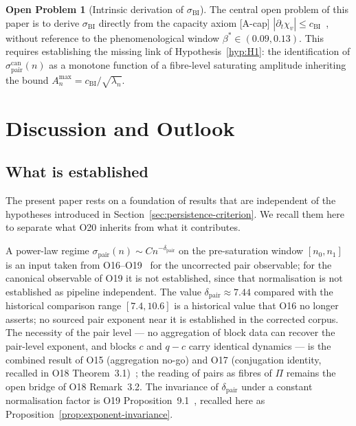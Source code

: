 \documentclass[11pt,a4paper]{article}
\theoremstyle{definition}
\newtheorem{openproblem}[theorem]{Open Problem}
\theoremstyle{remark}
\begin{document}
    \begin{openproblem}[Intrinsic derivation of $\sigma_{\mathrm{BI}}$]
      \label{op:sigma-BI}
      The central open problem of this paper is to derive
      $\sigma_{\mathrm{BI}}$ directly from the capacity axiom [A-cap]
      $|\partial_t \chi_v| \leq c_{\mathrm{BI}}$~\cite{Beau2026c},
      without reference to the phenomenological window
      $\beta^* \in (0.09, 0.13)$.
      This requires establishing the missing link of
      Hypothesis~\ref{hyp:H1}: the identification of
      $\sigma_{\mathrm{pair}}^{\mathrm{can}}(n)$ as a monotone function of
      a fibre-level saturating amplitude inheriting the bound
      $A_n^{\max} = c_{\mathrm{BI}}/\sqrt{\lambda_n}$.
    \end{openproblem}


  \section{Discussion and Outlook}
    \label{sec:discussion}

    \subsection{What is established}
      \label{sec:established}

      The present paper rests on a foundation of results that are
      independent of the hypotheses introduced in
      Section~\ref{sec:persistence-criterion}.
      We recall them here to separate what O20 inherits from what it
      contributes.

      A power-law regime
      $\sigma_{\mathrm{pair}}(n)
      \sim C n^{-\delta_{\mathrm{pair}}}$ on the pre-saturation window
      $[n_0, n_1]$ is an input taken from
      O16--O19~\cite{Beau2026a20,Beau2026a21,Beau2026a22,Beau2026a23} for the uncorrected
      pair observable; for the canonical observable of O19 it is not established, since that
      normalisation is not established as pipeline independent.
      The value $\delta_{\mathrm{pair}} \approx 7.44$ compared with the
      historical comparison range $[7.4,10.6]$ is a historical value that O16 no longer asserts;
      no sourced pair exponent near it is established in the corrected corpus.
      The necessity of the pair level --- no aggregation of block data can
      recover the pair-level exponent, and blocks $c$ and $q-c$ carry
      identical dynamics --- is the combined result of O15 (aggregation
      no-go) and O17 (conjugation identity, recalled in O18
      Theorem~3.1)~\cite{Beau2026a19,Beau2026a21,Beau2026a22};
      the reading of pairs as fibres of $\Pi$ remains the open bridge of
      O18 Remark~3.2.
      The invariance of $\delta_{\mathrm{pair}}$ under a constant
      normalisation factor is O19
      Proposition~9.1~\cite{Beau2026a23}, recalled here as
      Proposition~\ref{prop:exponent-invariance}.
\end{document}
